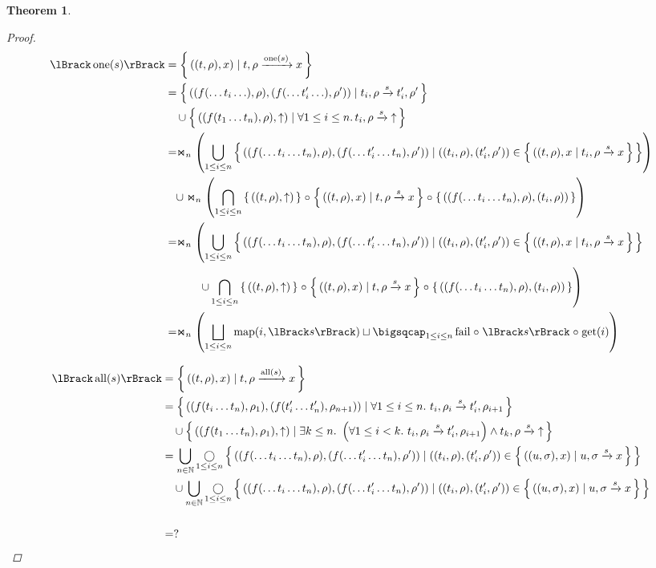\documentclass{article}
\newtheorem{theorem}{Theorem}
\newcommand{\fail}{\ensuremath \text{$\uparrow$}}
\newcommand{\one}[1]{\ensuremath \operatorname{one}(#1)}
\newcommand{\all}[1]{\ensuremath \operatorname{all}(#1)}
\newcommand{\transform}[5]{#1, #2 \xrightarrow{#3} #4, #5}
\newcommand{\transformx}[4]{#1, #2 \xrightarrow{#3} #4}
\newcommand{\transformfail}[3]{#1, #2 \xrightarrow{#3} \fail}
\newcommand{\sem}[1]{\ensuremath \lBrack #1 \rBrack}
\newcommand{\setbuild}[2]{\ensuremath \left\{\, #1 \mid #2 \,\right\}}
\newcommand{\setbuildc}[1]{\ensuremath \left\{\, #1 \,\right\}}
\newcommand{\lfail}{\ensuremath \operatorname{fail}}
\newcommand{\get}{\ensuremath \operatorname{get}}
\newcommand{\map}{\ensuremath \operatorname{map}}
\newcommand{\comp}{\ensuremath \mathrel{\circ}}
\newcommand{\witharity}{\ensuremath \Join}
\begin{document}
\begin{theorem}
\begin{proof}
\begin{align*}
  \sem{\one{s}}
    &= \setbuild{((t,\rho),x)}{\transformx{t}{\rho}{\one{s}}{x}} \\
    &= \setbuild{((f(\ldots t_i \ldots),\rho),(f(\ldots t_i' \ldots),\rho'))}{\transform{t_i}{\rho}{s}{t_i'}{\rho'}} \\
    &\quad \cup \setbuild{((f(t_1 \ldots t_n),\rho),\fail)}{\forall 1 \leq i \leq n.\, \transformfail{t_i}{\rho}{s}} \\
    &= \witharity_{n} \left( \bigcup_{1 \leq i \leq n} \setbuild{ ((f(\ldots t_i \ldots t_n),\rho),(f(\ldots t_i' \ldots t_n),\rho')) }{ ((t_i,\rho),(t_i',\rho')) \in \setbuild{ ((t,\rho),x }{ \transformx{t_i}{\rho}{s}{x} } } \right) \\
    &\quad \cup \witharity_{n} \left( \bigcap_{1 \leq i \leq n}  \setbuildc{ ((t,\rho),\fail) } \comp \setbuild{ ((t,\rho),x)}{ \transformx{t}{\rho}{s}{x} } \comp \setbuildc{ ((f(\ldots t_i \ldots t_n),\rho),(t_i,\rho)) } \right) \\
    &= \witharity_{n} \left( \bigcup_{1 \leq i \leq n} \setbuild{ ((f(\ldots t_i \ldots t_n),\rho),(f(\ldots t_i' \ldots t_n),\rho')) }{ ((t_i,\rho),(t_i',\rho')) \in \setbuild{ ((t,\rho),x }{ \transformx{t_i}{\rho}{s}{x} } } \right. \\
    &\qquad\quad \left. \cup \bigcap_{1 \leq i \leq n}  \setbuildc{ ((t,\rho),\fail) } \comp \setbuild{ ((t,\rho),x)}{ \transformx{t}{\rho}{s}{x} } \comp \setbuildc{ ((f(\ldots t_i \ldots t_n),\rho),(t_i,\rho)) } \right) \\
    &= \witharity_{n} \left( \bigsqcup_{1 \leq i \leq n} \map(i, \sem{s}) \sqcup \bigsqcap_{1 \leq i \leq n} \lfail \comp \sem{s} \comp \get(i) \right)
\end{align*}

\begin{align*}
  \sem{\all{s}}
    &= {\setbuild{((t,\rho),x)}{\transformx{t}{\rho}{\all{s}}{x}}} \\
    &= {\setbuild{((f(t_i\ldots t_n),\rho_1),(f(t_i'\ldots t_n'),\rho_{n+1}))}{ \forall 1 \leq i \leq n.\ \transform{t_i}{\rho_i}{s}{t_i'}{\rho_{i+1}}}} \\
    &\quad \cup \setbuild { ((f(t_1 \ldots t_n),\rho_1),\fail) }{ \exists k \leq n.\ \left(\forall 1 \leq i < k.\ \transform{t_i}{\rho_i}{s}{t_i'}{\rho_{i+1}}\right) \land \transformfail{t_k}{\rho}{s} } \\
    &= \bigcup_{n \in \mathbb{N}} \mathop{\bigcirc}_{1\leq i \leq n} \setbuild{((f(\ldots t_i \ldots t_n),\rho),(f(\ldots t_i' \ldots t_n),\rho'))}{ ((t_i,\rho),(t_i',\rho')) \in \setbuild{ ((u,\sigma),x) }{ \transformx{u}{\sigma}{s}{x} } } \\
    &\quad \cup \bigcup_{n \in \mathbb{N}} \mathop{\bigcirc}_{1 \leq i \leq n} \setbuild{((f(\ldots t_i \ldots t_n),\rho),(f(\ldots t_i' \ldots t_n),\rho'))}{ ((t_i,\rho),(t_i',\rho')) \in \setbuild{ ((u,\sigma),x) }{ \transformx{u}{\sigma}{s}{x} } } \\
    &\qquad\qquad\qquad  \\
    &= ?
\end{align*}
  
\end{proof}
\end{theorem}
\end{document}
